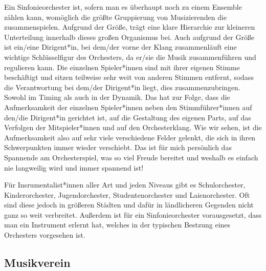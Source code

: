 Ein Sinfonieorchester ist, sofern man es überhaupt noch zu einem Ensemble zählen
kann, womöglich die größte Gruppierung von Musizierenden die zusammenspielen.
Aufgrund der Größe, trägt eine klare Hierarchie zur kleineren Unterteilung
innerhalb dieses großen Organismus bei. Auch aufgrund der Größe ist ein/eine
Dirigent*in, bei dem/der vorne der Klang zusammenläuft eine wichtige
Schlüsselfigur des Orchesters, da er/sie die Musik zusammenführen und regulieren
kann. Die einzelnen Spieler*innen sind mit ihrer eigenen Stimme beschäftigt und
sitzen teilweise sehr weit von anderen Stimmen entfernt, sodass die
Verantwortung bei dem/der Dirigent*in liegt, dies zusammenzubringen. Sowohl im
Timing als auch in der Dynamik. Das hat zur Folge, dass die Aufmerksamkeit der
einzelnen Spieler*innen neben den Stimmführer*innen auf den/die Dirigent*in
gerichtet ist, auf die Gestaltung des eigenen Parts, auf das Verfolgen der
Mitspieler*innen und auf den Orchesterklang.
\autocite[56]{doerne:umfassend_musizieren} Wie wir sehen, ist die Aufmerksamkeit
also auf sehr viele verschiedene Felder gelenkt, die sich in ihren Schwerpunkten
immer wieder verschiebt. Das ist für mich persönlich das Spannende am
Orchesterspiel, was so viel Freude bereitet und weshalb es einfach nie
langweilig wird und immer spannend ist!

Für Insrumentalist*innen aller Art und jeden Niveaus gibt es Schulorchester,
Kinderorchester, Jugendorchester, Studentenorchester und Laienorchester. Oft
sind diese jedoch in größeren Städten und dafür in ländlicheren Gegenden nicht
ganz so weit verbreitet. Außerdem ist für ein Sinfonieorchester vorausgesetzt,
dass man ein Instrument erlernt hat, welches in der typischen Bestzung eines
Orchesters vorgesehen ist. 



\subsection{Musikverein}

